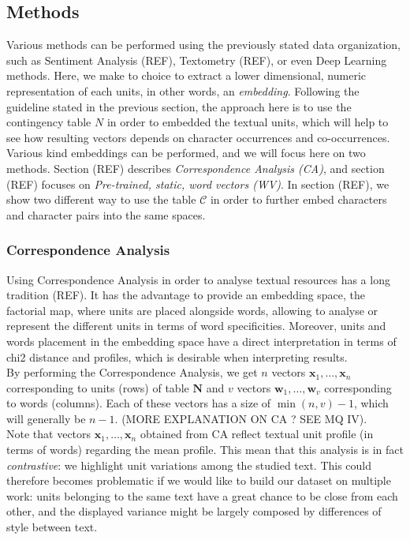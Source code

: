 \documentclass[
twocolumn,
]{ceurart}
\begin{document}
\subsection{Methods}

Various methods can be performed using the previously stated data organization, such as Sentiment Analysis (REF), Textometry (REF), or even Deep Learning methods. Here, we make to choice to extract a lower dimensional, numeric representation of each units, in other words, an \emph{embedding}. Following the guideline stated in the previous section, the approach here is to use the contingency table $N$ in order to embedded the textual units, which will help to see how resulting vectors depends on character occurrences and co-occurrences. Various kind embeddings can be performed, and we will focus here on two methods. Section (REF) describes \emph{Correspondence Analysis (CA)}, and section (REF) focuses on \emph{Pre-trained, static, word vectors (WV)}. In section (REF), we show two different way to use the table $\mathcal{C}$ in order to further embed characters and character pairs into the same spaces. 

\subsubsection{Correspondence Analysis}

Using Correspondence Analysis in order to analyse textual resources has a long tradition (REF). It has the advantage to provide an embedding space, the factorial map, where units are placed alongside words, allowing to analyse or represent the different units in terms of word specificities. Moreover, units and words placement in the embedding space have a direct interpretation in terms of chi2 distance and profiles, which is desirable when interpreting results. \\
By performing the Correspondence Analysis, we get $n$ vectors $\mathbf{x}_1, \ldots, \mathbf{x}_n$ corresponding to units (rows) of table $\mathbf{N}$ and $v$ vectors $\mathbf{w}_1, \ldots, \mathbf{w}_v$ corresponding to words (columns). Each of these vectors has a size of $\min(n, v) - 1$, which will generally be $n - 1$.  (MORE EXPLANATION ON CA ? SEE MQ IV).  \\
Note that vectors $\mathbf{x}_1, \ldots, \mathbf{x}_n$  obtained from CA reflect textual unit profile (in terms of words)  regarding the mean profile. This mean that this analysis is in fact \emph{contrastive}: we highlight unit variations among the studied text. This could therefore becomes problematic if we would like to build our dataset on multiple work: units belonging to the same text have a great chance to be close from each other, and the displayed variance might be largely composed by differences of style between text.   
\end{document}
